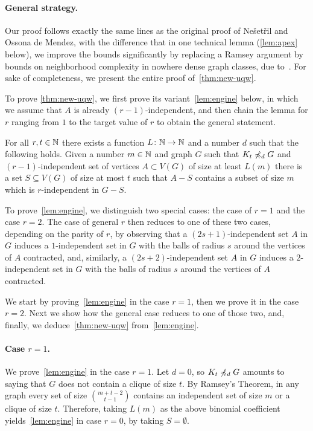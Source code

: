 \paragraph{General strategy.}
Our proof follows exactly the same lines as the original proof of Ne\v set\v ril and Ossona de Mendez, with the difference that in one technical lemma (\cref{lem:apex} below), we improve the bounds significantly by replacing a Ramsey argument by bounds on neighborhood
complexity in nowhere dense graph classes, due to~\cite{gajarsky2017kernelization}.
For sake of completeness, we present the entire proof of~\cref{thm:new-uqw}.


To prove
\cref{thm:new-uqw}, we first prove its variant~\cref{lem:engine} below, in which we assume that $A$ is already $(r-1)$-independent, and then chain the lemma for $r$ ranging from $1$ to the target value of $r$ to obtain the general statement.

\begin{lemma}\label{lem:engine}
For all $r,t\in \mathbb{N}$ there exists a function $L\colon \mathbb{N}\to \mathbb{N}$
and a number $d$ such that the following holds.
Given a number $m\in \mathbb{N}$ and graph $G$ such that $K_t\not\preccurlyeq_d G$ and
$(r-1)$-independent set of vertices $A\subset V(G)$ of size at least $L(m)$ there is a set $S\subseteq V(G)$ of size at most $t$ such that $A-S$ contains a subset of size $m$ which is $r$-independent in $G-S$.
\end{lemma}


To prove~\cref{lem:engine}, we distinguish two special cases: the case of $r=1$ and the case $r=2$. The case of general $r$ then reduces to one of these two cases, depending on the parity of $r$, by observing that a $(2s+1)$-independent set $A$ in $G$
induces a $1$-independent set in $G$ with the balls of radius $s$ around the vertices of $A$ contracted, and,
similarly, a $(2s+2)$-independent set $A$ in $G$
induces a $2$-independent set in $G$ with the balls of radius $s$ around the vertices of $A$ contracted.

We start by proving~\cref{lem:engine} in the case $r=1$,
then we prove it in the case $r=2$. Next we show how the general case reduces to one of those two, and, finally, we deduce~\cref{thm:new-uqw} from~\cref{lem:engine}.

\paragraph{Case $r=1$.}
We prove~\cref{lem:engine} in the case $r=1$.
Let $d=0$, so $K_t\not\preccurlyeq_d G$ amounts to saying that $G$
does not contain a clique of size $t$. By Ramsey's Theorem, in any graph every set of size $\binom{m+t-2}{t-1}$ contains an
independent set of size $m$ or a clique of size $t$. Therefore, 
taking $L(m)$ as the above binomial coefficient yields~\cref{lem:engine} in case $r=0$, by taking $S=\emptyset$.

